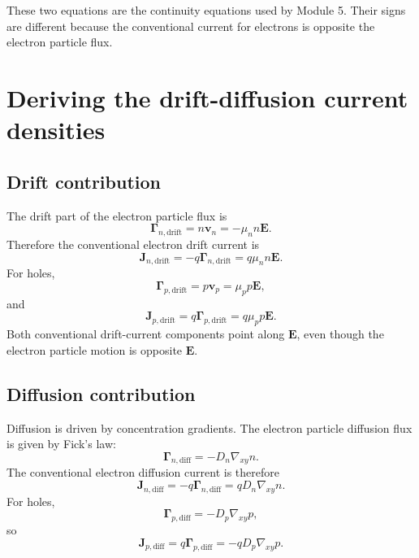 \documentclass[11pt]{article}
\newcommand{\Evec}{\bm{E}}
\newcommand{\Jvec}{\bm{J}}
\newcommand{\Gammavec}{\bm{\Gamma}}
\newcommand{\vvec}{\bm{v}}
\newcommand{\gradxy}{\nabla_{xy}}
\begin{document}
These two equations are the continuity equations used by Module 5. Their signs are different because the conventional current for electrons is opposite the electron particle flux.

\section{Deriving the drift-diffusion current densities}

\subsection{Drift contribution}

The drift part of the electron particle flux is
\begin{equation}
\Gammavec_{n,\mathrm{drift}}=n\vvec_n=-\mu_n n\Evec.
\end{equation}
Therefore the conventional electron drift current is
\begin{equation}
\Jvec_{n,\mathrm{drift}}=-q\Gammavec_{n,\mathrm{drift}}=q\mu_n n\Evec.
\end{equation}
For holes,
\begin{equation}
\Gammavec_{p,\mathrm{drift}}=p\vvec_p=\mu_p p\Evec,
\end{equation}
and
\begin{equation}
\Jvec_{p,\mathrm{drift}}=q\Gammavec_{p,\mathrm{drift}}=q\mu_p p\Evec.
\end{equation}
Both conventional drift-current components point along \(\Evec\), even though the electron particle motion is opposite \(\Evec\).

\subsection{Diffusion contribution}

Diffusion is driven by concentration gradients. The electron particle diffusion flux is given by Fick's law:
\begin{equation}
\Gammavec_{n,\mathrm{diff}}=-D_n\gradxy n.
\end{equation}
The conventional electron diffusion current is therefore
\begin{equation}
\Jvec_{n,\mathrm{diff}}=-q\Gammavec_{n,\mathrm{diff}}=qD_n\gradxy n.
\end{equation}
For holes,
\begin{equation}
\Gammavec_{p,\mathrm{diff}}=-D_p\gradxy p,
\end{equation}
so
\begin{equation}
\Jvec_{p,\mathrm{diff}}=q\Gammavec_{p,\mathrm{diff}}=-qD_p\gradxy p.
\end{equation}
\end{document}
